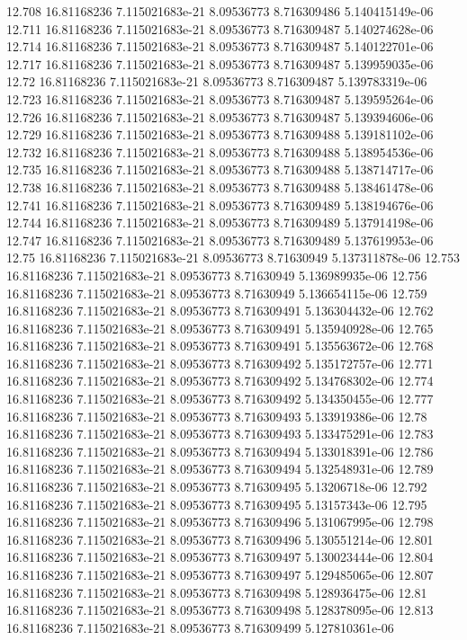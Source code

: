 {12.708 16.81168236 7.115021683e-21 8.09536773 8.716309486 5.140415149e-06
12.711 16.81168236 7.115021683e-21 8.09536773 8.716309487 5.140274628e-06
12.714 16.81168236 7.115021683e-21 8.09536773 8.716309487 5.140122701e-06
12.717 16.81168236 7.115021683e-21 8.09536773 8.716309487 5.139959035e-06
12.72 16.81168236 7.115021683e-21 8.09536773 8.716309487 5.139783319e-06
12.723 16.81168236 7.115021683e-21 8.09536773 8.716309487 5.139595264e-06
12.726 16.81168236 7.115021683e-21 8.09536773 8.716309487 5.139394606e-06
12.729 16.81168236 7.115021683e-21 8.09536773 8.716309488 5.139181102e-06
12.732 16.81168236 7.115021683e-21 8.09536773 8.716309488 5.138954536e-06
12.735 16.81168236 7.115021683e-21 8.09536773 8.716309488 5.138714717e-06
12.738 16.81168236 7.115021683e-21 8.09536773 8.716309488 5.138461478e-06
12.741 16.81168236 7.115021683e-21 8.09536773 8.716309489 5.138194676e-06
12.744 16.81168236 7.115021683e-21 8.09536773 8.716309489 5.137914198e-06
12.747 16.81168236 7.115021683e-21 8.09536773 8.716309489 5.137619953e-06
12.75 16.81168236 7.115021683e-21 8.09536773 8.71630949 5.137311878e-06
12.753 16.81168236 7.115021683e-21 8.09536773 8.71630949 5.136989935e-06
12.756 16.81168236 7.115021683e-21 8.09536773 8.71630949 5.136654115e-06
12.759 16.81168236 7.115021683e-21 8.09536773 8.716309491 5.136304432e-06
12.762 16.81168236 7.115021683e-21 8.09536773 8.716309491 5.135940928e-06
12.765 16.81168236 7.115021683e-21 8.09536773 8.716309491 5.135563672e-06
12.768 16.81168236 7.115021683e-21 8.09536773 8.716309492 5.135172757e-06
12.771 16.81168236 7.115021683e-21 8.09536773 8.716309492 5.134768302e-06
12.774 16.81168236 7.115021683e-21 8.09536773 8.716309492 5.134350455e-06
12.777 16.81168236 7.115021683e-21 8.09536773 8.716309493 5.133919386e-06
12.78 16.81168236 7.115021683e-21 8.09536773 8.716309493 5.133475291e-06
12.783 16.81168236 7.115021683e-21 8.09536773 8.716309494 5.133018391e-06
12.786 16.81168236 7.115021683e-21 8.09536773 8.716309494 5.132548931e-06
12.789 16.81168236 7.115021683e-21 8.09536773 8.716309495 5.13206718e-06
12.792 16.81168236 7.115021683e-21 8.09536773 8.716309495 5.13157343e-06
12.795 16.81168236 7.115021683e-21 8.09536773 8.716309496 5.131067995e-06
12.798 16.81168236 7.115021683e-21 8.09536773 8.716309496 5.130551214e-06
12.801 16.81168236 7.115021683e-21 8.09536773 8.716309497 5.130023444e-06
12.804 16.81168236 7.115021683e-21 8.09536773 8.716309497 5.129485065e-06
12.807 16.81168236 7.115021683e-21 8.09536773 8.716309498 5.128936475e-06
12.81 16.81168236 7.115021683e-21 8.09536773 8.716309498 5.128378095e-06
12.813 16.81168236 7.115021683e-21 8.09536773 8.716309499 5.127810361e-06
}
